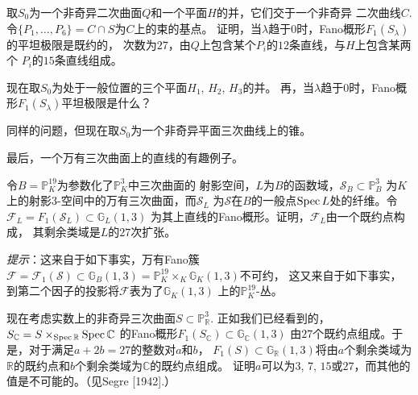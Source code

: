 \nottran


\nottran

\begin{exe}\label{exe:4.78}
取$S_0$为一个非奇异二次曲面$Q$和一个平面$H$的并，它们交于一个非奇异
二次曲线$C$. 令$\{P_1,\dots,P_6\}=C\cap S$为$C$上的束的基点。
证明，当$\lambda$趋于$0$时，Fano概形$F_1(S_\lambda)$的平坦极限是既约的，
次数为$27$，由$Q$上包含某个$P_i$的$12$条直线，与$H$上包含某两个
$P_i$的$15$条直线组成。
\end{exe}

\begin{exe}\label{exe:4.79}
现在取$S_0$为处于一般位置的三个平面$H_1$, $H_2$, $H_3$的并。 
再，当$\lambda$趋于$0$时，Fano概形$F_1(S_\lambda)$平坦极限是什么？
\end{exe}

\begin{exe}\label{exe:4.80}
同样的问题，但现在取$S_0$为一个非奇异平面三次曲线上的锥。
\end{exe}

最后，一个万有三次曲面上的直线的有趣例子。

\begin{exe}\label{exe:4.81}
令$B=\mathbb{P}_{K}^{19}$为参数化了$\mathbb{P}_{K}^{3}$中三次曲面的
射影空间，$L$为$B$的函数域，$\mathscr{S}_{B} \subset \mathbb{P}_{B}^{3}$
为$K$上的射影$3$-空间中的万有三次曲面，而$\mathscr{S}_{L}$
为$\mathscr{S}$在$B$的一般点$\operatorname{Spec} L$处的纤维。令
$\mathscr{F}_{L}=F_{1}\left(\mathscr{S}_{L}\right) \subset \mathbb{G}_{L}(1,3)$ 
为其上直线的Fano概形。证明，$\mathscr{F}_{L}$由一个既约点构成，
其剩余类域是$L$的$27$次扩张。

\emph{提示}：这来自于如下事实，万有Fano簇$\mathscr{F}=\mathscr{F}_{1}(\mathscr{S}) \subset \mathbb{G}_{B}(1,3)=\mathbb{P}_{K}^{19} \times_{K} \mathbb{G}_{K}(1,3)$不可约，
这又来自于如下事实，到第二个因子的投影将$\mathscr F$表为了$\mathbb{G}_{K}(1,3)$
上的$\mathbb{P}_{K}^{19}$-丛。
\end{exe}


\begin{exe}\label{exe:4.82}
现在考虑实数上的非奇异三次曲面$S \subset \mathbb{P}_{\mathbb{R}}^{3}$. 
正如我们已经看到的，$S_{\mathbb{C}}=S \times_{\operatorname{Spec} \mathbb{R}}\operatorname{Spec} \mathbb{C}$ 
的Fano概形$F_{1}\left(S_{\mathbb{C}}\right) \subset \mathbb{G}_{\mathbb{C}}(1,3)$
由$27$个既约点组成。于是，对于满足$a+2 b=27$的整数对$a$和$b$，
$F_{1}(S) \subset \mathbb{G}_{\mathbb{R}}(1,3)$将由$a$个剩余类域为
$\mathbb{R}$的既约点和$b$个剩余类域为$\mathbb{C}$的既约点组成。
证明$a$可以为$3$, $7$, $15$或$27$，而其他的值是不可能的。（见Segre [1942].）
\end{exe}